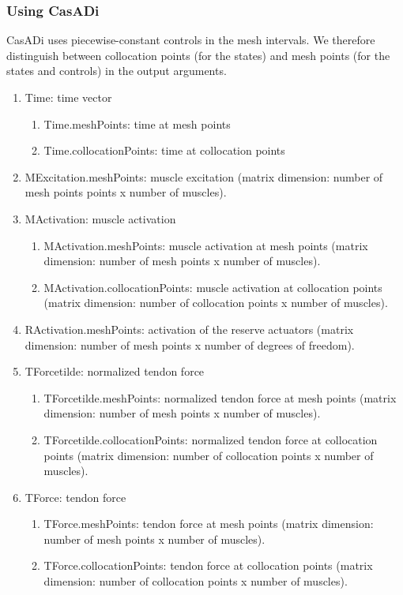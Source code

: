 \documentclass[a4paper,oneside,11pt]{article}
\begin{document}
\subsubsection{Using CasADi}
CasADi uses piecewise-constant controls in the mesh intervals. We therefore distinguish between collocation points (for the states) and mesh points (for the states and controls) in the output arguments.

\begin{enumerate}
	\item Time: time vector
	\begin{enumerate}
	\item Time.meshPoints: time at mesh points
	\item Time.collocationPoints: time at collocation points
	\end{enumerate}
	\item MExcitation.meshPoints: muscle excitation (matrix dimension: number of mesh points points x number of muscles).
	\item MActivation: muscle activation
	\begin{enumerate}
	\item MActivation.meshPoints: muscle activation at mesh points (matrix dimension: number of mesh points x number of muscles).
	\item MActivation.collocationPoints: muscle activation at collocation points (matrix dimension: number of collocation points x number of muscles). 
	\end{enumerate}
	\item RActivation.meshPoints: activation of the reserve actuators (matrix dimension: number of mesh points x number of degrees of freedom).
	\item TForcetilde: normalized tendon force 
	\begin{enumerate}
	\item TForcetilde.meshPoints: normalized tendon force at mesh points (matrix dimension: number of mesh points x number of muscles).
	\item TForcetilde.collocationPoints: normalized tendon force at collocation points (matrix dimension: number of collocation points x number of muscles). 
	\end{enumerate}
	\item TForce: tendon force 
	\begin{enumerate}
	\item TForce.meshPoints: tendon force at mesh points (matrix dimension: number of mesh points x number of muscles).
	\item TForce.collocationPoints: tendon force at collocation points (matrix dimension: number of collocation points x number of muscles). 

\end{enumerate}
\end{enumerate}
\end{document}
